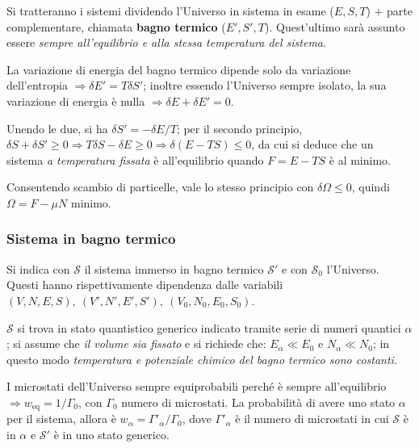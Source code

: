 \documentclass[10pt, a4paper]{scrartcl}
\numberwithin{equation}{subsection}
\theoremstyle{style1}
\theoremstyle{style2}
\begin{document}
Si tratteranno i sistemi dividendo l'Universo in sistema in esame ($E,S,T$) $+$ parte complementare, chiamata \textbf{bagno termico} ($E',S',T$). Quest'ultimo sar\`a assunto essere \textit{sempre all'equilibrio e alla stessa temperatura del sistema}. 

La variazione di energia del bagno termico dipende solo da variazione dell'entropia $\Rightarrow \delta E' = T \delta S'$; inoltre essendo l'Universo sempre isolato, la sua variazione di energia \`e nulla $\Rightarrow \delta E + \delta E' =0$. 

Unendo le due, si ha $\delta S' = -\delta E / T$; per il secondo principio, $\delta S + \delta S' \ge 0 \Rightarrow T\delta S - \delta E \ge 0 \Rightarrow \delta (E-TS) \le 0$, da cui si deduce che un sistema \textit{a temperatura fissata} \`e all'equilibrio quando $F = E- TS $ \`e al minimo.

Consentendo scambio di particelle, vale lo stesso principio con $\delta \Omega \le 0$, quindi $\Omega = F - \mu N $ minimo.
\subsubsection{Sistema in bagno termico}

Si indica con $\mathscr{S}$ il sistema immerso in bagno termico $\mathscr{S}'$ e con $\mathscr{S}_0$ l'Universo. Questi hanno rispettivamente dipendenza dalle variabili $(V,N,E,S), \ (V',N',E',S') , \ (V_0,N_0,E_0,S_0)$.

$\mathscr{S}$ si trova in stato quantistico generico indicato tramite serie di numeri quantici $\alpha $; si assume che \textit{il volume sia fissato} e si richiede che: $E_\alpha \ll E_0$ e $N_\alpha  \ll N_0$; in questo modo \textit{temperatura e potenziale chimico del bagno termico sono costanti}.

I microstati dell'Universo sempre equiprobabili perch\'e \`e sempre all'equilibrio $\Rightarrow w_\text{eq} = 1 / \Gamma_0$, con $\Gamma_0$ numero di microstati. La probabilit\`a di avere uno stato $\alpha $ per il sistema, allora \`e $w_\alpha  = \Gamma'_\alpha  / \Gamma_0$, dove $\Gamma'_\alpha $ \`e il numero di microstati in cui $\mathscr{S}$ \`e in $\alpha $ e $\mathscr{S}' $ \`e in uno stato generico.
\end{document}
